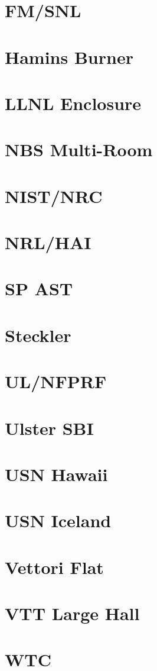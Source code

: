 \clearpage


\section{FM/SNL}

\section{Hamins Burner}

\section{LLNL Enclosure}

\section{NBS Multi-Room}

\section{NIST/NRC}

\section{NRL/HAI}

\section{SP AST}

\section{Steckler}

\section{UL/NFPRF}

\section{Ulster SBI}

\section{USN Hawaii}

\section{USN Iceland}

\section{Vettori Flat}

\section{VTT Large Hall}

\section{WTC}

